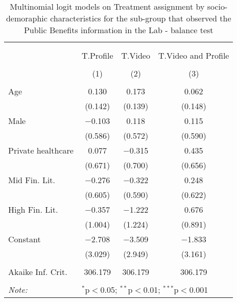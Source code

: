 
\begin{table}[H] \centering 
  \caption{Multinomial logit models on Treatment assignment by socio-demoraphic characteristics for the sub-group that observed the Public Benefits information in the Lab - balance test} 
  \label{tbl:balance_public_lab} 
\begin{tabular}{@{\extracolsep{5pt}}lccc} 
\\[-1.8ex]\hline 
\hline \\[-1.8ex] 
\\[-1.8ex] & T.Profile & T.Video & T.Video and Profile \\ 
\\[-1.8ex] & (1) & (2) & (3)\\ 
\hline \\[-1.8ex] 
 Age & 0.130 & 0.173 & 0.062 \\ 
  & (0.142) & (0.139) & (0.148) \\ 
  Male & $-$0.103 & 0.118 & 0.115 \\ 
  & (0.586) & (0.572) & (0.590) \\ 
  Private healthcare & 0.077 & $-$0.315 & 0.435 \\ 
  & (0.671) & (0.700) & (0.656) \\ 
  Mid Fin. Lit. & $-$0.276 & $-$0.322 & 0.248 \\ 
  & (0.605) & (0.590) & (0.622) \\ 
  High Fin. Lit. & $-$0.357 & $-$1.222 & 0.676 \\ 
  & (1.004) & (1.224) & (0.891) \\ 
  Constant & $-$2.708 & $-$3.509 & $-$1.833 \\ 
  & (3.029) & (2.949) & (3.161) \\ 
 \hline \\[-1.8ex] 
Akaike Inf. Crit. & 306.179 & 306.179 & 306.179 \\ 
\hline 
\hline \\[-1.8ex] 
\textit{Note:}  & \multicolumn{3}{l}{$^{*}$p$<$0.05; $^{**}$p$<$0.01; $^{***}$p$<$0.001} \\ 
\end{tabular} 
\end{table} 
